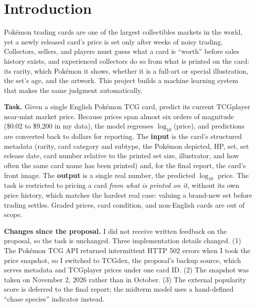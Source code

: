 \documentclass{article}
\begin{document}


\section{Introduction}

Pok\'emon trading cards are one of the largest collectibles markets in the world, yet a newly released card's price is set only after weeks of noisy trading. Collectors, sellers, and players must guess what a card is ``worth'' before sales history exists, and experienced collectors do so from what is printed on the card: its rarity, which Pok\'emon it shows, whether it is a full-art or special illustration, the set's age, and the artwork. This project builds a machine learning system that makes the same judgment automatically.

\textbf{Task.} Given a single English Pok\'emon TCG card, predict its current TCGplayer near-mint market price. Because prices span almost six orders of magnitude (\$0.02 to \$9{,}200 in my data), the model regresses $\log_{10}$(price), and predictions are converted back to dollars for reporting. The \textbf{input} is the card's structured metadata (rarity, card category and subtype, the Pok\'emon depicted, HP, set, set release date, card number relative to the printed set size, illustrator, and how often the same card name has been printed) and, for the final report, the card's front image. The \textbf{output} is a single real number, the predicted $\log_{10}$ price. The task is restricted to pricing a card \emph{from what is printed on it}, without its own price history, which matches the hardest real case: valuing a brand-new set before trading settles. Graded prices, card condition, and non-English cards are out of scope.

\textbf{Changes since the proposal.} I did not receive written feedback on the proposal, so the task is unchanged. Three implementation details changed. (1) The Pok\'emon TCG API \citep{pokemontcgapi} returned intermittent HTTP 502 errors when I took the price snapshot, so I switched to TCGdex, the proposal's backup source, which serves metadata and TCGplayer prices under one card ID. (2) The snapshot was taken on November 2, 2026 rather than in October. (3) The external popularity score is deferred to the final report; the midterm model uses a hand-defined ``chase species'' indicator instead.
\end{document}
